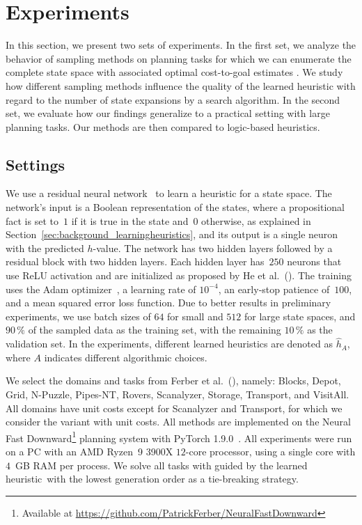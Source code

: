 \chapter{Experiments}
\label{sec:experiments}

In this section, we present two sets of experiments. In the first set, we analyze the behavior of sampling methods on planning tasks for which we can enumerate the complete state space with associated optimal cost-to-goal estimates \hstar. We study how different sampling methods influence the quality of the learned heuristic with regard to the number of state expansions by a search algorithm. In the second set, we evaluate how our findings generalize to a practical setting with large planning tasks. Our methods are then compared to logic-based heuristics.

\section{Settings}
\label{sec:exp_settings}

We use a residual neural network~\cite{He.etal/2016} to learn a heuristic for a state space. The network's input is a Boolean representation of the states, where a propositional fact is set to~$1$ if it is true in the state and~$0$ otherwise, as explained in Section~\ref{sec:background_learningheuristics}, and its output is a single neuron with the predicted $h$-value. The network has two hidden layers followed by a residual block with two hidden layers. Each hidden layer has~$250$ neurons that use ReLU activation and are initialized as proposed by He et al.~(\citeyear{He.etal/2015}). The training uses the Adam optimizer~\cite{Kingma.Ba/2015}, a learning rate of $10^{-4}$, an early-stop patience of~$100$, and a mean squared error loss function. Due to better results in preliminary experiments, we use batch sizes of $64$ for small and $512$ for large state spaces, and $90\,\%$ of the sampled data as the training set, with the remaining $10\,\%$ as the validation set. In the experiments, different learned heuristics are denoted as $\hat h_A$, where $A$ indicates different algorithmic choices.

We select the domains and tasks from Ferber et al.~(\citeyear{Ferber.etal/2022}), namely: Blocks, Depot, Grid, N-Puzzle, Pipes-NT, Rovers, Scanalyzer, Storage, Transport, and VisitAll. All domains have unit costs except for Scanalyzer and Transport, for which we consider the variant with unit costs. All methods are implemented on the Neural Fast Downward\footnote{Available at \url{https://github.com/PatrickFerber/NeuralFastDownward}} planning system with PyTorch 1.9.0~\cite{Ferber.etal/2020a,Paszke/2019}. All experiments were run on a PC with an AMD Ryzen~9 3900X $12$-core processor, using a single core with $4$~GB RAM per process. We solve all tasks with \gbfs guided by the learned heuristic~\hnn with the lowest generation order as a tie-breaking strategy.

